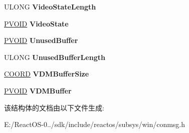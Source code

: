 \begin{DoxyCompactItemize}
\mbox{\label{struct___c_o_n_s_o_l_e___r_e_g_i_s_t_e_r_v_d_m_abe31e1ae39dbedd6396fb66e1c7e22fd}} 
U\+L\+O\+NG {\bfseries Video\+State\+Length}
\item 
\mbox{\label{struct___c_o_n_s_o_l_e___r_e_g_i_s_t_e_r_v_d_m_abde65209c26d648febbed26e8a479535}} 
\hyperlink{interfacevoid}{P\+V\+O\+ID} {\bfseries Video\+State}
\item 
\mbox{\label{struct___c_o_n_s_o_l_e___r_e_g_i_s_t_e_r_v_d_m_ad25209ab7f1af60373d702397a6dba71}} 
\hyperlink{interfacevoid}{P\+V\+O\+ID} {\bfseries Unused\+Buffer}
\item 
\mbox{\label{struct___c_o_n_s_o_l_e___r_e_g_i_s_t_e_r_v_d_m_a68f13ded45cf2f28bad1becd06fe679f}} 
U\+L\+O\+NG {\bfseries Unused\+Buffer\+Length}
\item 
\mbox{\label{struct___c_o_n_s_o_l_e___r_e_g_i_s_t_e_r_v_d_m_ab4201b05786826d2f4090f107cd12654}} 
\hyperlink{struct___c_o_o_r_d}{C\+O\+O\+RD} {\bfseries V\+D\+M\+Buffer\+Size}
\item 
\mbox{\label{struct___c_o_n_s_o_l_e___r_e_g_i_s_t_e_r_v_d_m_aa8a327eeb60cb54c256f63d2bcfde310}} 
\hyperlink{interfacevoid}{P\+V\+O\+ID} {\bfseries V\+D\+M\+Buffer}
\end{DoxyCompactItemize}


该结构体的文档由以下文件生成\+:\begin{DoxyCompactItemize}
\item 
E\+:/\+React\+O\+S-\/0../sdk/include/reactos/subsys/win/conmsg.\+h\end{DoxyCompactItemize}
